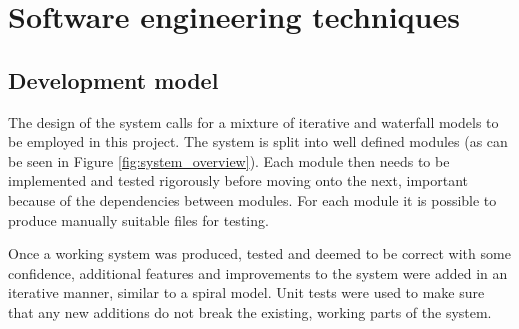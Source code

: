 \documentclass[12pt,twoside,notitlepage]{report}
\begin{document}
    \section{Software engineering techniques}
        \subsection{Development model}
            The design of the system calls for a mixture of iterative and waterfall models to be employed in this project.
            The system is split into well defined modules (as can be seen in Figure \ref{fig:system_overview}). Each module 
            then needs to be implemented and tested rigorously before moving onto the next, important because of the 
            dependencies between modules. For each module it is possible to produce manually suitable files for testing.

            Once a working system was produced, tested and deemed to be correct with some confidence, additional 
            features and improvements to the system were added in an iterative manner, similar to a spiral model. Unit 
            tests were used to make sure that any new additions do not break the existing, working parts of the system.
\end{document}
